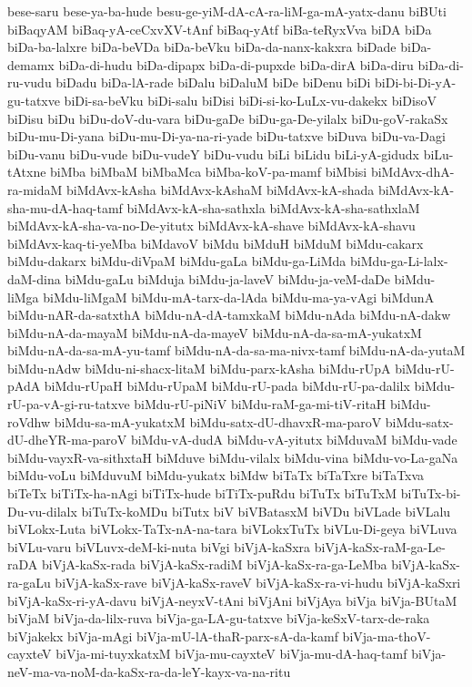 {bese-saru
bese-ya-ba-hude
besu-ge-yiM-dA-cA-ra-liM-ga-mA-yatx-danu
biBUti
biBaqyAM
biBaq-yA-ceCxvXV-tAnf
biBaq-yAtf
biBa-teRyxVva
biDA
biDa
biDa-ba-lalxre
biDa-beVDa
biDa-beVku
biDa-da-nanx-kakxra
biDade
biDa-demamx
biDa-di-hudu
biDa-dipapx
biDa-di-pupxde
biDa-dirA
biDa-diru
biDa-di-ru-vudu
biDadu
biDa-lA-rade
biDalu
biDaluM
biDe
biDenu
biDi
biDi-bi-Di-yA-gu-tatxve
biDi-sa-beVku
biDi-salu
biDisi
biDi-si-ko-LuLx-vu-dakekx
biDisoV
biDisu
biDu
biDu-doV-du-vara
biDu-gaDe
biDu-ga-De-yilalx
biDu-goV-rakaSx
biDu-mu-Di-yana
biDu-mu-Di-ya-na-ri-yade
biDu-tatxve
biDuva
biDu-va-Dagi
biDu-vanu
biDu-vude
biDu-vudeY
biDu-vudu
biLi
biLidu
biLi-yA-gidudx
biLu-tAtxne
biMba
biMbaM
biMbaMca
biMba-koV-pa-mamf
biMbisi
biMdAvx-dhA-ra-midaM
biMdAvx-kAsha
biMdAvx-kAshaM
biMdAvx-kA-shada
biMdAvx-kA-sha-mu-dA-haq-tamf
biMdAvx-kA-sha-sathxla
biMdAvx-kA-sha-sathxlaM
biMdAvx-kA-sha-va-no-De-yitutx
biMdAvx-kA-shave
biMdAvx-kA-shavu
biMdAvx-kaq-ti-yeMba
biMdavoV
biMdu
biMduH
biMduM
biMdu-cakarx
biMdu-dakarx
biMdu-diVpaM
biMdu-gaLa
biMdu-ga-LiMda
biMdu-ga-Li-lalx-daM-dina
biMdu-gaLu
biMduja
biMdu-ja-laveV
biMdu-ja-veM-daDe
biMdu-liMga
biMdu-liMgaM
biMdu-mA-tarx-da-lAda
biMdu-ma-ya-vAgi
biMdunA
biMdu-nAR-da-satxthA
biMdu-nA-dA-tamxkaM
biMdu-nAda
biMdu-nA-dakw
biMdu-nA-da-mayaM
biMdu-nA-da-mayeV
biMdu-nA-da-sa-mA-yukatxM
biMdu-nA-da-sa-mA-yu-tamf
biMdu-nA-da-sa-ma-nivx-tamf
biMdu-nA-da-yutaM
biMdu-nAdw
biMdu-ni-shacx-litaM
biMdu-parx-kAsha
biMdu-rUpA
biMdu-rU-pAdA
biMdu-rUpaH
biMdu-rUpaM
biMdu-rU-pada
biMdu-rU-pa-dalilx
biMdu-rU-pa-vA-gi-ru-tatxve
biMdu-rU-piNiV
biMdu-raM-ga-mi-tiV-ritaH
biMdu-roVdhw
biMdu-sa-mA-yukatxM
biMdu-satx-dU-dhavxR-ma-paroV
biMdu-satx-dU-dheYR-ma-paroV
biMdu-vA-dudA
biMdu-vA-yitutx
biMduvaM
biMdu-vade
biMdu-vayxR-va-sithxtaH
biMduve
biMdu-vilalx
biMdu-vina
biMdu-vo-La-gaNa
biMdu-voLu
biMduvuM
biMdu-yukatx
biMdw
biTaTx
biTaTxre
biTaTxva
biTeTx
biTiTx-ha-nAgi
biTiTx-hude
biTiTx-puRdu
biTuTx
biTuTxM
biTuTx-bi-Du-vu-dilalx
biTuTx-koMDu
biTutx
biV
biVBatasxM
biVDu
biVLade
biVLalu
biVLokx-Luta
biVLokx-TaTx-nA-na-tara
biVLokxTuTx
biVLu-Di-geya
biVLuva
biVLu-varu
biVLuvx-deM-ki-nuta
biVgi
biVjA-kaSxra
biVjA-kaSx-raM-ga-Le-raDA
biVjA-kaSx-rada
biVjA-kaSx-radiM
biVjA-kaSx-ra-ga-LeMba
biVjA-kaSx-ra-gaLu
biVjA-kaSx-rave
biVjA-kaSx-raveV
biVjA-kaSx-ra-vi-hudu
biVjA-kaSxri
biVjA-kaSx-ri-yA-davu
biVjA-neyxV-tAni
biVjAni
biVjAya
biVja
biVja-BUtaM
biVjaM
biVja-da-lilx-ruva
biVja-ga-LA-gu-tatxve
biVja-keSxV-tarx-de-raka
biVjakekx
biVja-mAgi
biVja-mU-lA-thaR-parx-sA-da-kamf
biVja-ma-thoV-cayxteV
biVja-mi-tuyxkatxM
biVja-mu-cayxteV
biVja-mu-dA-haq-tamf
biVja-neV-ma-va-noM-da-kaSx-ra-da-leY-kayx-va-na-ritu
}
